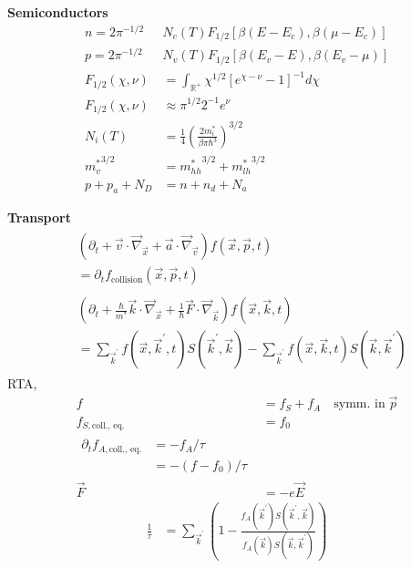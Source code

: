 \documentclass[12pt]{article}
\begin{document}
\begin{multicols}{2}
\noindent
\textbf{Semiconductors}
\begin{align}
  n = 2\pi^{-1/2}&N_c(T)F_{1/2}[\beta(E - E_c), \beta(\mu - E_c)]\\
  p = 2\pi^{-1/2}&N_v(T)F_{1/2}[\beta(E_v - E), \beta(E_v - \mu)]\\
  F_{1/2}(\chi, \nu) &= \int_{\mathbb{R}^+} \chi^{1/2}[e^{\chi - \nu} - 1]^{-1}d\chi\\
  F_{1/2}(\chi, \nu) &\approx \pi^{1/2}2^{-1}e^{\nu}\\
  N_i(T) &= \frac{1}{4}(\frac{2m_i^*}{\beta\pi\hbar^3})^{3/2}\\
  {m_v^*}^{3/2} &= {m_{hh}^*}^{3/2} + {m_{lh}^*}^{3/2}\\
  p + p_a + N_D &= n + n_d + N_a
\end{align}

\noindent
\textbf{Transport}
\begin{align}
  \begin{split}
    &(\partial_t + \vec{v} \cdot \vec{\nabla}_{\vec{x}} + \vec{a} \cdot \vec{\nabla}_{\vec{v}}) f(\vec{x}, \vec{p}, t)\\
    &=\partial_t f_{\textrm{collision}}(\vec{x}, \vec{p}, t)
  \end{split}\\
  \begin{split}
    &(\partial_t + \frac{\hbar}{m^*} \vec{k} \cdot \vec{\nabla}_{\vec{x}}
    + \frac{1}{\hbar} \vec{F} \cdot \vec{\nabla}_{\vec{k}}) f(\vec{x}, \vec{k}, t)\\
    &= \sum_{\vec{k}^{\prime}}f(\vec{x}, \vec{k}^{\prime}, t)S(\vec{k}^{\prime}, \vec{k}) - \sum_{\vec{k}^{\prime}} f(\vec{x}, \vec{k}, t) S(\vec{k}, \vec{k}^{\prime})
  \end{split}
\end{align}
RTA,
\begin{align}
  f &= f_S + f_A \quad \textrm{symm. in} \; \vec{p}\\
  f_{S, \textrm{coll., eq.}} &= f_0\\
  \begin{split}
    \partial_t f_{A, \textrm{coll., eq.}} &= -f_A/\tau\\
    &= -(f - f_0)/\tau
  \end{split}\\
  \vec{F} &= -e\vec{E}
\end{align}
\begin{align}
  \frac{1}{\tau} &= \sum_{\vec{k}^{\prime}}(1 -
  \frac{f_A(\vec{k}^{\prime}) S(\vec{k}^{\prime}, \vec{k})}{f_A(\vec{k})S(\vec{k}, \vec{k}^{\prime})})

\end{align}
\end{multicols}
\end{document}
